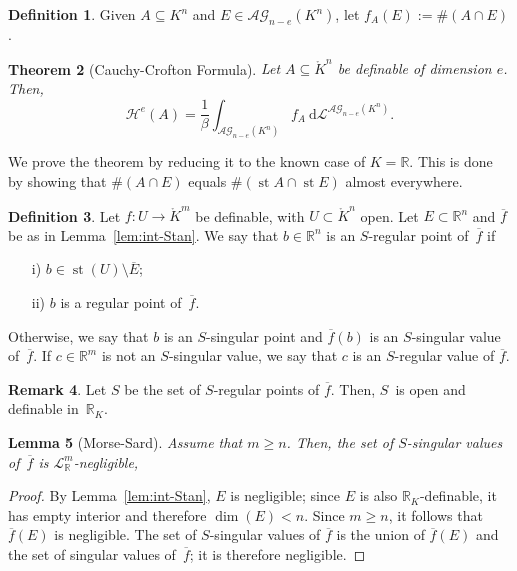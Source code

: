 \documentclass[a4paper, 12pt, final]{article}
\newtheorem{lem}{Lemma}[section]
\newtheorem{thm}[lem]{Theorem}
\newtheorem{open problem}[lem]{Open problem}
\theoremstyle{remark}
\theoremstyle{definition}
\newtheorem{dfn}[lem]{Definition}
\newtheorem{rem}[lem]{Remark}
\newtheorem{final remark}[lem]{Final remark}
\begin{document}
\begin{dfn}
Given $A \subseteq {K}^n$ and $E \in {\mathcal{AG}}_{n-e}({K}^n)$, let $f_A(E) := \# (A \cap E)$.
\end{dfn}

\begin{thm}[Cauchy-Crofton Formula]\label{thm:Cauchy-Crofton}
Let $A \subseteq {\mathring {K}}^n$ be definable of dimension $e$.
Then,
\[
{{\mathcal H}^{e}}(A) = \frac 1 \beta \int_{{\mathcal{AG}}_{n-e}({K}^n)} f_A {\:\mathrm d} {\mathcal L}^{{\mathcal{AG}}_{n-e}({K}^n)}.
\]
\end{thm}

We prove the theorem by reducing it to the known case of ${K}={\mathbb{R}}$. This is done by showing that $\# (A\cap E)$ equals $\#(\operatorname{st} A\cap\operatorname{st} E)$ almost everywhere.

\begin{dfn}
Let $f: U \to {\mathring {K}}^m$ be definable, with $U\subset{\mathring {K}}^n$ open. 
Let $E \subset {\mathbb{R}}^n$ and ${\overline{f}}$ be as in Lemma~\ref{lem:int-Stan}.
We say that  
$b \in {\mathbb{R}}^n$ is an $S$-regular point of~${\overline{f}}$ if
\begin{enumerate}
\item [i)] $b \in \operatorname{st}(U) \setminus {\overline{E}}$;
\item [ii)] $b$ is a regular point of~${\overline{f}}$.
\end{enumerate}
Otherwise, we say that $b$ is an $S$-singular point 
and ${\overline{f}}(b)$ is an $S$-singular value of~${\overline{f}}$. 
If $c\in{\mathbb{R}}^m$ is not an $S$-singular value, we say that $c$ is an $S$-regular value of ${\overline{f}}$.
\end{dfn}

\begin{rem}
Let $S$ be the set of $S$-regular points of ${\overline{f}}$.
Then, $S$~is open and definable in~${\mathbb{R}}_{K}$. 
\end{rem}

\begin{lem}[Morse-Sard]\label{lem:Sard}
Assume that $m \geq n$.
Then, the set of $S$-singular values of~${\overline{f}}$ is ${\mathcal L}^m_{\mathbb{R}}$-negligible,
\end{lem}
\begin{proof} 
By Lemma~\ref{lem:int-Stan}, $E$ is negligible;
since $E$ is also ${\mathbb{R}}_{K}$-definable, it has empty
interior and therefore $\dim(E)<n$. 
Since $m\geq n$, it  follows that ${\overline{f}}(E)$ is negligible. 
The set of $S$-singular values of ${\overline{f}}$ is the union of
${\overline{f}}(E)$ and the set of singular values of~${\overline{f}}$; it is therefore negligible.
\end{proof}
\end{document}
